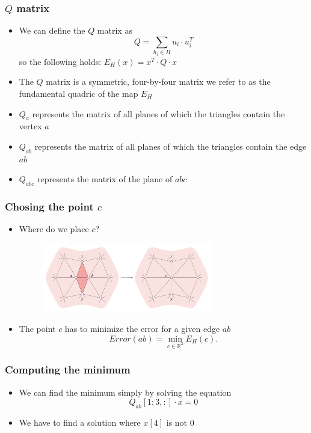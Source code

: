 \documentclass{beamer}
\begin{document}
\begin{frame}[t]
    \frametitle{$Q$ matrix}
    \begin{itemize}
        \item We can define the $Q$ matrix as \[Q = \sum_{h_i \in H} u_i \cdot u_i^T\]
        so the following holds: $E_H(x) = x^T \cdot Q \cdot x$
        \item The $Q$ matrix is a symmetric, four-by-four matrix we refer to as the fundamental quadric of
        the map $E_H$
        \item $Q_a$ represents the matrix of all planes of which the triangles
        contain the vertex $a$
        \item $Q_{ab}$ represents the matrix of all planes of which the triangles
        contain the edge $ab$
        \item $Q_{abc}$ represents the matrix of the plane of $abc$
    \end{itemize}
\end{frame}
\begin{frame}[t]
    \frametitle{Chosing the point $c$}
    \begin{itemize}
    
        \item Where do we place $c$?
        \begin{figure}[h]
            \begin{center}
                \includegraphics[width=0.7\textwidth]{edge_contract.png}
            \end{center}
        \end{figure}
        \item The point $c$ has to minimize the error for a given edge $ab$
        \[Error(ab) = \min_{c\in \mathbb{R}^3} E_H(c).\]
    \end{itemize}
\end{frame}
\begin{frame}[t]
    \frametitle{Computing the minimum}
    \begin{itemize}
        \item We can find the minimum simply by solving the equation
        \[
            Q_{ab}[1:3, :] \cdot x = 0
        \]
        \item We have to find a solution where $x[4]$ is not 0
    \end{itemize}
\end{frame}
\end{document}
